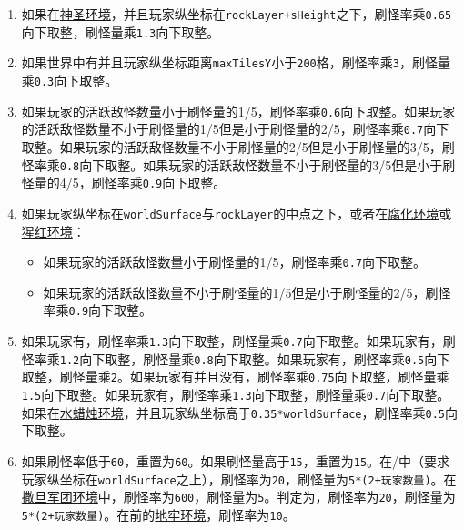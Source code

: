 \begin{enumerate}
    \item 如果在\hyperref[app37]{神圣环境}，并且玩家纵坐标在\lstinline{rockLayer+sHeight}之下，刷怪率乘\lstinline{0.65}向下取整，刷怪量乘\lstinline{1.3}向下取整。
    \item 如果世界中有并且玩家纵坐标距离\lstinline{maxTilesY}小于\lstinline{200}格，刷怪率乘\lstinline{3}，刷怪量乘\lstinline{0.3}向下取整。
    \item 如果玩家的活跃敌怪数量小于刷怪量的1/5，刷怪率乘\lstinline{0.6}向下取整。如果玩家的活跃敌怪数量不小于刷怪量的1/5但是小于刷怪量的2/5，刷怪率乘\lstinline{0.7}向下取整。如果玩家的活跃敌怪数量不小于刷怪量的2/5但是小于刷怪量的3/5，刷怪率乘\lstinline{0.8}向下取整。如果玩家的活跃敌怪数量不小于刷怪量的3/5但是小于刷怪量的4/5，刷怪率乘\lstinline{0.9}向下取整。
    \item 如果玩家纵坐标在\lstinline{worldSurface}与\lstinline{rockLayer}的中点之下，或者在\hyperref[app37]{腐化环境}或\hyperref[app37]{猩红环境}：\begin{itemize}
        \item 如果玩家的活跃敌怪数量小于刷怪量的1/5，刷怪率乘\lstinline{0.7}向下取整。
        \item 如果玩家的活跃敌怪数量不小于刷怪量的1/5但是小于刷怪量的2/5，刷怪率乘\lstinline{0.9}向下取整。
    \end{itemize}
    \item 如果玩家有，刷怪率乘\lstinline{1.3}向下取整，刷怪量乘\lstinline{0.7}向下取整。如果玩家有，刷怪率乘\lstinline{1.2}向下取整，刷怪量乘\lstinline{0.8}向下取整。如果玩家有，刷怪率乘\lstinline{0.5}向下取整，刷怪量乘\lstinline{2}。如果玩家有并且没有，刷怪率乘\lstinline{0.75}向下取整，刷怪量乘\lstinline{1.5}向下取整。如果玩家有，刷怪率乘\lstinline{1.3}向下取整，刷怪量乘\lstinline{0.7}向下取整。如果在\hyperref[app37]{水蜡烛环境}，并且玩家纵坐标高于\lstinline{0.35*worldSurface}，刷怪率乘\lstinline{0.5}向下取整。
    \item 如果刷怪率低于\lstinline{60}，重置为\lstinline{60}。如果刷怪量高于\lstinline{15}，重置为\lstinline{15}。在/中（要求玩家纵坐标在\lstinline{worldSurface}之上），刷怪率为\lstinline{20}，刷怪量为\lstinline{5*(2+玩家数量)}。在\hyperref[app37]{撒旦军团环境}中，刷怪率为\lstinline{600}，刷怪量为\lstinline{5}。判定为，刷怪率为\lstinline{20}，刷怪量为\lstinline{5*(2+玩家数量)}。在前的\hyperref[app37]{地牢环境}，刷怪率为\lstinline{10}。

\end{enumerate}
